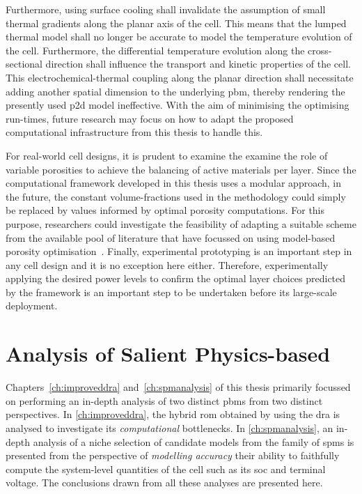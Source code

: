 Furthermore,  using surface  cooling shall  invalidate the  assumption of  small
thermal gradients along the planar axis of  the cell. This means that the lumped
thermal model  shall no longer  be accurate  to model the  temperature evolution
of  the cell.  Furthermore,  the differential  temperature  evolution along  the
cross-sectional direction  shall influence the transport  and kinetic properties
of the  cell. This electrochemical-thermal  coupling along the  planar direction
shall necessitate adding another spatial  dimension to the underlying \gls{pbm},
thereby rendering the  presently used \gls{p2d} model ineffective.  With the aim
of minimising  the optimising  run-times, future  research may  focus on  how to
adapt the proposed computational infrastructure from this thesis to handle this.

For  real-world cell  designs, it  is prudent  to examine  the examine  the role
of  variable  porosities  to  achieve  the balancing  of  active  materials  per
layer.  Since  the computational  framework  developed  in  this thesis  uses  a
modular  approach, in  the future,  the  constant volume-fractions  used in  the
methodology  could simply  be replaced  by values  informed by  optimal porosity
computations. For this purpose, researchers could investigate the feasibility of
adapting  a suitable  scheme from  the available  pool of  literature that  have
focussed  on  using  model-based  porosity  optimisation~\cite{Xue2013,Xue2014a,
Christensen2006}. Finally, experimental prototyping is  an important step in any
cell  design and  it  is  no exception  here  either. Therefore,  experimentally
applying the desired power levels to confirm the optimal layer choices predicted
by the  framework is an important  step to be undertaken  before its large-scale
deployment.


\section{Analysis of Salient Physics-based }

Chapters~\ref{ch:improveddra} and~\ref{ch:spmanalysis} of  this thesis primarily
focussed on performing an in-depth analysis of two distinct \glspl{pbm} from two
distinct perspectives.  In \cref{ch:improveddra}, the hybrid  \gls{rom} obtained
by  using the  \gls{dra}  is analysed  to  investigate its  \emph{computational}
bottlenecks. In \cref{ch:spmanalysis}, an in-depth analysis of a niche selection
of  candidate models  from  the  family of  \glspl{spm}  is  presented from  the
perspective  of  \emph{modelling accuracy}  \ie{}  their  ability to  faithfully
compute  the system-level  quantities  of the  cell such  as  its \gls{soc}  and
terminal voltage.  The conclusions drawn  from all these analyses  are presented
here.

